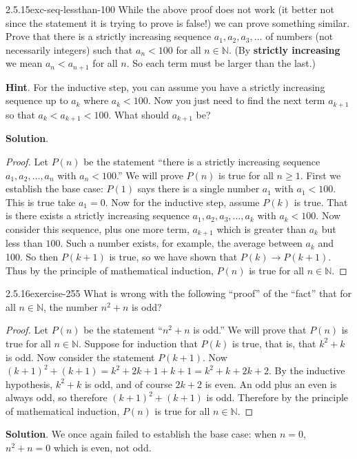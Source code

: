 \documentclass[twoside,11pt,]{book}
\newcommand{\terminology}[1]{\textbf{#1}}
\numberwithin{equation}{chapter}
\newcommand{\N}{\mathbb N}
\newcommand{\imp}{\rightarrow}
\newcommand{\lt}{<}
\begin{document}
\begin{divisionsolution}{2.5.15}{}{exc-seq-lessthan-100}%
\hypertarget{p-3645}{}%
While the above proof does not work (it better not since the statement it is trying to prove is false!) we can prove something similar. Prove that there is a strictly increasing sequence \(a_1, a_2, a_3, \ldots\) of numbers (not necessarily integers) such that \(a_n \lt 100\) for all \(n \in \N\). (By \terminology{strictly increasing} we mean \(a_n \lt a_{n+1}\) for all \(n\). So each term must be larger than the last.)%
\par\smallskip%
\noindent\textbf{Hint}.\quad%
\hypertarget{p-3646}{}%
For the inductive step, you can assume you have a strictly increasing sequence up to \(a_k\) where \(a_k \lt 100\).  Now you just need to find the next term \(a_{k+1}\) so that \(a_{k} \lt a_{k+1} \lt 100\).  What should \(a_{k+1}\) be?%
\par\smallskip%
\noindent\textbf{Solution}.\quad%
\begin{proof}{}
\hypertarget{p-3647}{}%
Let \(P(n)\) be the statement ``there is a strictly increasing sequence \(a_1, a_2, \ldots,
a_n\) with \(a_n \lt 100\).'' We will prove \(P(n)\) is true for all \(n \ge 1\). First we establish the base case: \(P(1)\) says there is a single number \(a_1\) with \(a_1 \lt 100\). This is true \textendash{} take \(a_1 = 0\). Now for the inductive step, assume \(P(k)\) is true. That is there exists a strictly increasing sequence \(a_1, a_2, a_3, \ldots,
a_k\) with \(a_k \lt 100\). Now consider this sequence, plus one more term, \(a_{k+1}\) which is greater than \(a_k\) but less than \(100\). Such a number exists, for example, the average between \(a_k\) and 100. So then \(P(k+1)\) is true, so we have shown that \(P(k) \imp P(k+1)\). Thus by the principle of mathematical induction, \(P(n)\) is true for all \(n \in \N\).%
\end{proof}
\end{divisionsolution}%
\begin{divisionsolution}{2.5.16}{}{exercise-255}%
\hypertarget{p-3648}{}%
What is wrong with the following ``proof'' of the ``fact'' that for all \(n \in \N\), the number \(n^2 + n\) is odd?%
\begin{proof}{}
\hypertarget{p-3649}{}%
Let \(P(n)\) be the statement ``\(n^2 + n\) is odd.'' We will prove that \(P(n)\) is true for all \(n \in \N\). Suppose for induction that \(P(k)\) is true, that is, that \(k^2 + k\) is odd. Now consider the statement \(P(k+1)\). Now \((k+1)^2 + (k+1) = k^2 + 2k + 1 + k + 1 = k^2 + k + 2k + 2\). By the inductive hypothesis, \(k^2 + k\) is odd, and of course \(2k + 2\) is even. An odd plus an even is always odd, so therefore \((k+1)^2 + (k+1)\) is odd. Therefore by the principle of mathematical induction, \(P(n)\) is true for all \(n \in \N\).%
\end{proof}
\par\smallskip%
\noindent\textbf{Solution}.\quad%
\hypertarget{p-3650}{}%
We once again failed to establish the base case: when \(n = 0\), \(n^2 + n = 0\) which is even, not odd.%
\end{divisionsolution}%
\end{document}
